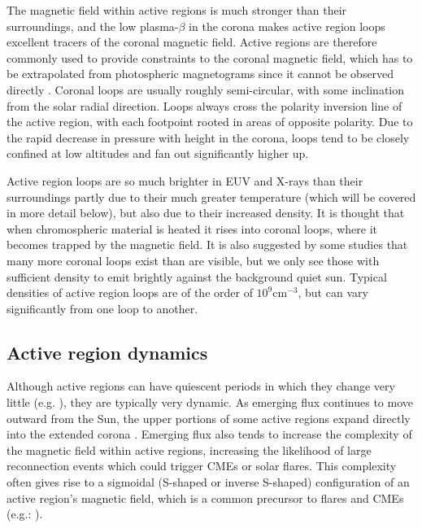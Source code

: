 \documentclass{article}
\begin{document}
The magnetic field within active regions is much stronger than their
surroundings, and the low plasma-$\beta$ in the corona makes active
region loops excellent tracers of the coronal magnetic field. Active
regions are therefore commonly used to provide constraints to the
coronal magnetic field, which has to be extrapolated from photospheric
magnetograms since it cannot be observed directly \citep{Wiegelmann2012}.
Coronal loops are usually roughly semi-circular, with some inclination
from the solar radial direction. Loops always cross the polarity inversion
line of the active region, with each footpoint rooted in areas of
opposite polarity. Due to the rapid decrease in pressure with height
in the corona, loops tend to be closely confined at low altitudes
and fan out significantly higher up.

Active region loops are so much brighter in EUV and X-rays than their
surroundings partly due to their much greater temperature (which will
be covered in more detail below), but also due to their increased
density. It is thought that when chromospheric material is heated
it rises into coronal loops, where it becomes trapped by the magnetic
field. It is also suggested by some studies  that many more coronal
loops exist than are visible, but we only see those with sufficient
density to emit brightly against the background quiet sun. Typical
densities of active region loops are of the order of $10^{9}\textrm{cm}^{-3}$,
but can vary significantly from one loop to another.


\subsection{Active region dynamics}
Although active regions can have quiescent periods in which they change
very little (e.g. \citet{DelZanna2003}), they are typically very
dynamic. As emerging flux continues to move outward from the Sun,
the upper portions of some active regions expand directly into the
extended corona \citep{Morgan2013}. Emerging flux also tends to increase
the complexity of the magnetic field within active regions, increasing
the likelihood of large reconnection events which could trigger CMEs
or solar flares. This complexity often gives rise to a sigmoidal (S-shaped
or inverse S-shaped) configuration of an active region's magnetic
field, which is a common precursor to flares and CMEs (e.g.: \citet{Gibson2002,Wang2000}).
\end{document}
